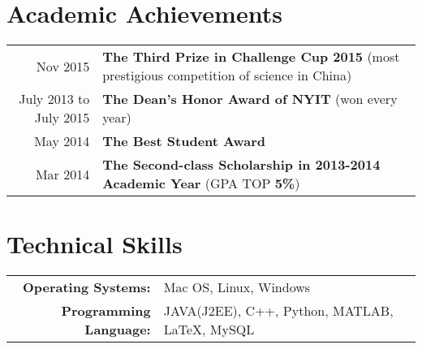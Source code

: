 \documentclass[a4paper, 10pt]{extarticle} %
\begin{document}
\begin{CJK*}{GBK}{song}
\section{Academic Achievements}

\begin{tabular}{rl}
Nov 2015 & \hspace{10mm}\textbf{The Third Prize in Challenge Cup 2015 }(most prestigious competition of science in China)\\
July 2013 to July 2015& \hspace{10mm}\textbf{The Dean's Honor Award of NYIT} (won every year)\\

May 2014 & \hspace{10mm}\textbf{The Best Student Award}\\

Mar 2014 & \hspace{10mm}\textbf{The Second-class Scholarship in 2013-2014 Academic Year} (GPA TOP \textbf{5\%})\\
\end{tabular}



\section{Technical Skills}

\begin{tabular}{rl}
\textbf{Operating Systems:} & \hspace{8mm} Mac OS, Linux, Windows\\

\textbf{Programming Language:} & \hspace{8mm} JAVA(J2EE), C++, Python, MATLAB, \LaTeX, MySQL\\

\end{tabular}



\end{CJK*}
\end{document}
